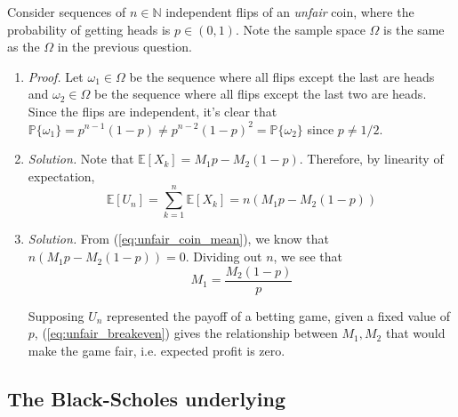 \documentclass{article}
\numberwithin{equation}{section}
\begin{document}
Consider sequences of $ n \in \mathbb{N} $ independent flips of an
\textit{unfair} coin, where the probability of getting heads is
$ p \in (0, 1) $. Note the sample space $ \Omega $ is the same as the
$ \Omega $ in the previous question.
\begin{enumerate}[label = \alph*.]
    \item
    \textit{Proof.} Let $ \omega_1 \in \Omega $ be the sequence where all
    flips except the last are heads and $ \omega_2 \in \Omega $ be the
    sequence where all flips except the last two are heads. Since the flips
    are independent, it's clear that $ \mathbb{P}\{\omega_1\} =
    p^{n - 1}(1 - p) \ne p^{n - 2}(1 - p)^2 = \mathbb{P}\{\omega_2\} $ since
    $ p \ne 1 / 2 $.

    \item
    \textit{Solution.} Note that $ \mathbb{E}[X_k] = M_1p - M_2(1 - p) $.
    Therefore, by linearity of expectation,
    \begin{equation} \label{eq:unfair_coin_mean}
        \mathbb{E}[U_n] = \sum_{k = 1}^n\mathbb{E}[X_k] = n(M_1p - M_2(1 - p))
    \end{equation}

    \item
    \textit{Solution.} From (\ref{eq:unfair_coin_mean}), we know that
    $ n(M_1p - M_2(1 - p)) = 0 $. Dividing out $ n $, we see that
    \begin{equation} \label{eq:unfair_breakeven}
        M_1 = \frac{M_2(1 - p)}{p}
    \end{equation}

    Supposing $ U_n $ represented the payoff of a betting game, given a fixed
    value of $ p $, (\ref{eq:unfair_breakeven}) gives the relationship between
    $ M_1, M_2 $ that would make the game fair, i.e. expected profit is zero.
\end{enumerate}

\subsection{The Black-Scholes underlying}
\end{document}

